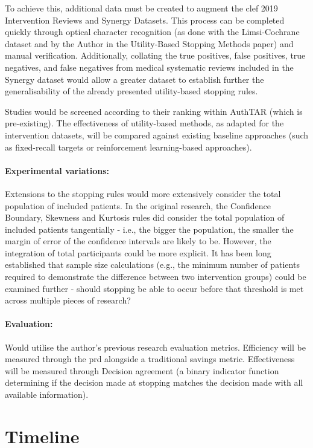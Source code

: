 \documentclass[10pt,oneside]{book}
\begin{document}
To achieve this, additional data must be created to augment the \gls*{clef} 2019 Intervention Reviews and Synergy Datasets. This process can be completed quickly through optical character recognition (as done with the Limsi-Cochrane dataset and by the Author in the Utility-Based Stopping Methods paper) and manual verification. Additionally, collating the true positives, false positives, true negatives, and false negatives from medical systematic reviews included in the Synergy dataset would allow a greater dataset to establish further the generalisability of the already presented utility-based stopping rules.

Studies would be screened according to their ranking within AuthTAR (which is pre-existing). The effectiveness of utility-based methods, as adapted for the intervention datasets, will be compared against existing baseline approaches (such as fixed-recall targets or reinforcement learning-based approaches).

\paragraph{Experimental variations:}
 Extensions to the stopping rules would more extensively consider the total population of included patients. In the original research, the Confidence Boundary, Skewness and Kurtosis rules did consider the total population of included patients tangentially - i.e., the bigger the population, the smaller the margin of error of the confidence intervals are likely to be. However, the integration of total participants could be more explicit. It has been long established that sample size calculations (e.g., the minimum number of patients required to demonstrate the difference between two intervention groups) could be examined further - should stopping be able to occur before that threshold is met across multiple pieces of research? 

\paragraph{Evaluation:}
Would utilise the author's previous research evaluation metrics. Efficiency will be measured through the \gls*{prd}  alongside a traditional savings metric. Effectiveness will be measured through Decision agreement (a binary indicator function determining if the decision made at stopping matches the decision made with all available information). 

\section{Timeline}
\end{document}
